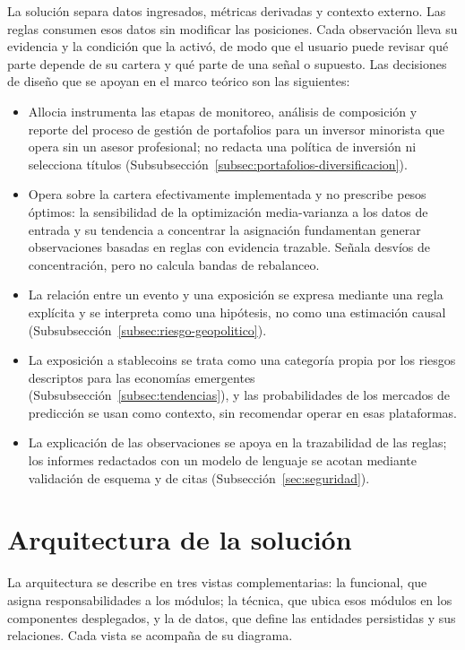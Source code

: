 La solución separa datos ingresados, métricas derivadas y contexto externo. Las reglas consumen esos datos sin modificar las posiciones. Cada observación lleva su evidencia y la condición que la activó, de modo que el usuario puede revisar qué parte depende de su cartera y qué parte de una señal o supuesto. Las decisiones de diseño que se apoyan en el marco teórico son las siguientes:
\begin{itemize}
\item Allocia instrumenta las etapas de monitoreo, análisis de composición y reporte del proceso de gestión de portafolios para un inversor minorista que opera sin un asesor profesional; no redacta una política de inversión ni selecciona títulos (Subsubsección~\ref{subsec:portafolios-diversificacion}).
\item Opera sobre la cartera efectivamente implementada y no prescribe pesos óptimos: la sensibilidad de la optimización media-varianza a los datos de entrada y su tendencia a concentrar la asignación fundamentan generar observaciones basadas en reglas con evidencia trazable. Señala desvíos de concentración, pero no calcula bandas de rebalanceo.
\item La relación entre un evento y una exposición se expresa mediante una regla explícita y se interpreta como una hipótesis, no como una estimación causal (Subsubsección~\ref{subsec:riesgo-geopolitico}).
\item La exposición a stablecoins se trata como una categoría propia por los riesgos descriptos para las economías emergentes (Subsubsección~\ref{subsec:tendencias}), y las probabilidades de los mercados de predicción se usan como contexto, sin recomendar operar en esas plataformas.
\item La explicación de las observaciones se apoya en la trazabilidad de las reglas; los informes redactados con un modelo de lenguaje se acotan mediante validación de esquema y de citas (Subsección~\ref{sec:seguridad}).
\end{itemize}


\section{Arquitectura de la solución}\label{sec:arquitectura}

La arquitectura se describe en tres vistas complementarias: la funcional, que asigna responsabilidades a los módulos; la técnica, que ubica esos módulos en los componentes desplegados, y la de datos, que define las entidades persistidas y sus relaciones. Cada vista se acompaña de su diagrama.


